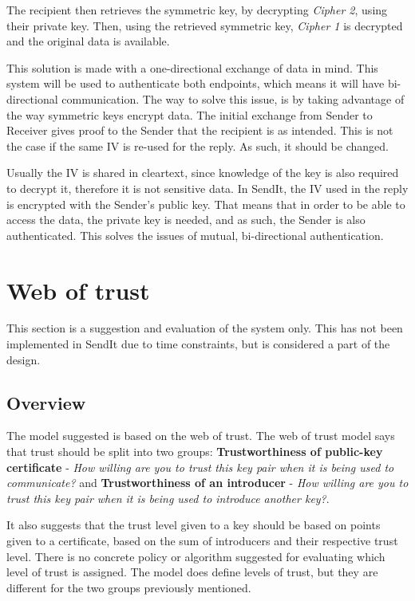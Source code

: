    The recipient then retrieves the symmetric key, by decrypting \emph{Cipher 2}, using their private key. Then, using the retrieved symmetric key, \emph{Cipher 1} is decrypted and the original data is available.

    This solution is made with a one-directional exchange of data in mind. This system will be used to authenticate both endpoints, which means it will have bi-directional communication. The way to solve this issue, is by taking advantage of the way symmetric keys encrypt data. The initial exchange from Sender to Receiver gives proof to the Sender that the recipient is as intended. This is not the case if the same IV is re-used for the reply. As such, it should be changed.

    Usually the IV is shared in cleartext, since knowledge of the key is also required to decrypt it, therefore it is not sensitive data. In SendIt, the IV used in the reply is encrypted with the Sender's public key. That means that in order to be able to access the data, the private key is needed, and as such, the Sender is also authenticated. This solves the issues of mutual, bi-directional authentication.

%
\section{Web of trust}
\label{sec:trustmodel}
%
    This section is a suggestion and evaluation of the system only. This has not been implemented in SendIt due to time constraints, but is considered a part of the design.

    \subsection{Overview}
    The model suggested is based on the web of trust. The web of trust model says that trust should be split into two groups: \textbf{Trustworthiness of public-key certificate} - \emph{How willing are you to trust this key pair when it is being used to communicate?} and \textbf{Trustworthiness of an introducer} - \emph{How willing are you to trust this key pair when it is being used to introduce another key?}.

    It also suggests that the trust level given to a key should be based on points given to a certificate, based on the sum of introducers and their respective trust level. There is no concrete policy or algorithm suggested for evaluating which level of trust is assigned. The model does define levels of trust, but they are different for the two groups previously mentioned. 

